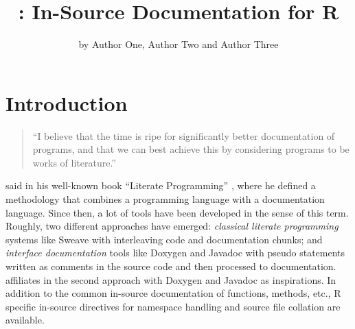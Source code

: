 \title{: In-Source Documentation for R}
\author{by Author One, Author Two and Author Three}

\maketitle



\section{Introduction\label{intro}}

\begin{quote}
  ``I believe that the time is ripe for significantly better
  documentation of programs, and that we can best achieve this by
  considering programs to be works of literature.''
\end{quote}
said \citeauthor{Knuth@1992} in his well-known book ``Literate
Programming'' \citep{Knuth@1992}, where he defined a methodology that
combines a programming language with a documentation language. Since
then, a lot of tools have been developed in the sense of this
term. Roughly, two different approaches have emerged: \textit{classical
  literate programming} systems like Sweave \citep{Leisch@2002} with
interleaving code and documentation chunks; and \textit{interface
  documentation} tools like Doxygen \citep{doxygen} and Javadoc
\citep{javadoc} with pseudo statements written as comments in the
source code and then processed to documentation. 
\citep{roxygen2} affiliates in the second approach with Doxygen and
Javadoc as inspirations. In addition to the common in-source
documentation of functions, methods, etc., R specific in-source
directives for namespace handling and source file collation are
available.






